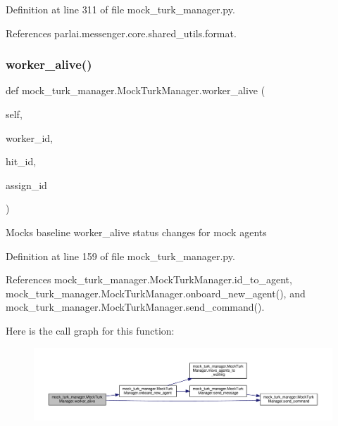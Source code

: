 Definition at line 311 of file mock\+\_\+turk\+\_\+manager.\+py.



References parlai.\+messenger.\+core.\+shared\+\_\+utils.\+format.

\mbox{\label{classmock__turk__manager_1_1MockTurkManager_a617657d87cfb41c503404845b5c116c7}} 
\subsubsection{\texorpdfstring{worker\+\_\+alive()}{worker\_alive()}}
{\footnotesize\ttfamily def mock\+\_\+turk\+\_\+manager.\+Mock\+Turk\+Manager.\+worker\+\_\+alive (\begin{DoxyParamCaption}\item[{}]{self,  }\item[{}]{worker\+\_\+id,  }\item[{}]{hit\+\_\+id,  }\item[{}]{assign\+\_\+id }\end{DoxyParamCaption})}

\begin{DoxyVerb}Mocks baseline worker_alive status changes for mock agents\end{DoxyVerb}
 

Definition at line 159 of file mock\+\_\+turk\+\_\+manager.\+py.



References mock\+\_\+turk\+\_\+manager.\+Mock\+Turk\+Manager.\+id\+\_\+to\+\_\+agent, mock\+\_\+turk\+\_\+manager.\+Mock\+Turk\+Manager.\+onboard\+\_\+new\+\_\+agent(), and mock\+\_\+turk\+\_\+manager.\+Mock\+Turk\+Manager.\+send\+\_\+command().

Here is the call graph for this function\+:
\nopagebreak
\begin{figure}[H]
\begin{center}
\leavevmode
\includegraphics[width=350pt]{classmock__turk__manager_1_1MockTurkManager_a617657d87cfb41c503404845b5c116c7_cgraph}
\end{center}
\end{figure}


